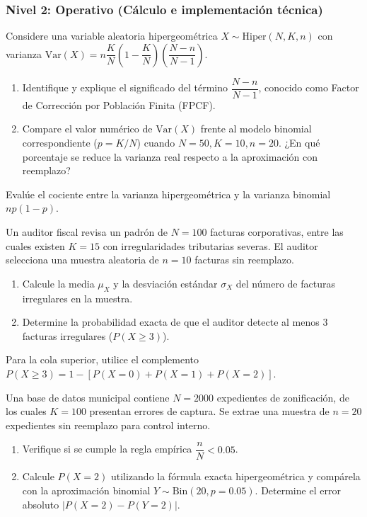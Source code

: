 \subsubsection*{Nivel 2: Operativo (Cálculo e implementación técnica)}

\begin{problema}
	\label{prob:3.6.4}
	Considere una variable aleatoria hipergeométrica $X \sim \text{Hiper}(N, K, n)$ con varianza $\text{Var}(X) = n \dfrac{K}{N} \left(1 - \dfrac{K}{N}\right) \left(\dfrac{N-n}{N-1}\right)$.
	\begin{enumerate}
		\item Identifique y explique el significado del término $\dfrac{N-n}{N-1}$, conocido como Factor de Corrección por Población Finita (FPCF).
		\item Compare el valor numérico de $\text{Var}(X)$ frente al modelo binomial correspondiente ($p = K/N$) cuando $N=50, K=10, n=20$. ¿En qué porcentaje se reduce la varianza real respecto a la aproximación con reemplazo?
	\end{enumerate}
\end{problema}

\begin{sugerencia}
	Evalúe el cociente entre la varianza hipergeométrica y la varianza binomial $np(1-p)$.
\end{sugerencia}

\begin{problema}
	\label{prob:3.6.5}
	Un auditor fiscal revisa un padrón de $N=100$ facturas corporativas, entre las cuales existen $K=15$ con irregularidades tributarias severas. El auditor selecciona una muestra aleatoria de $n=10$ facturas sin reemplazo.
	\begin{enumerate}
		\item Calcule la media $\mu_X$ y la desviación estándar $\sigma_X$ del número de facturas irregulares en la muestra.
		\item Determine la probabilidad exacta de que el auditor detecte al menos $3$ facturas irregulares ($P(X \ge 3)$).
	\end{enumerate}
\end{problema}

\begin{sugerencia}
	Para la cola superior, utilice el complemento $P(X \ge 3) = 1 - [P(X=0) + P(X=1) + P(X=2)]$.
\end{sugerencia}

\begin{problema}
	\label{prob:3.6.6}
	Una base de datos municipal contiene $N=2000$ expedientes de zonificación, de los cuales $K=100$ presentan errores de captura. Se extrae una muestra de $n=20$ expedientes sin reemplazo para control interno.
	\begin{enumerate}
		\item Verifique si se cumple la regla empírica $\dfrac{n}{N} < 0.05$.
		\item Calcule $P(X = 2)$ utilizando la fórmula exacta hipergeométrica y compárela con la aproximación binomial $Y \sim \text{Bin}(20, p=0.05)$. Determine el error absoluto $|P(X=2) - P(Y=2)|$.
	\end{enumerate}
\end{problema}


